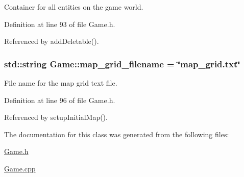 Container for all entities on the game world. 



Definition at line 93 of file Game.\-h.



Referenced by add\-Deletable().

\hypertarget{classGame_a3fe27799b59753fa9d7d0249b17fc64b}{
\subsubsection[{map\-\_\-grid\-\_\-filename}]{\setlength{\rightskip}{0pt plus 5cm}std\-::string Game\-::map\-\_\-grid\-\_\-filename = \char`\"{}map\-\_\-grid.\-txt\char`\"{}\hspace{0.3cm}{\ttfamily [private]}}}\label{classGame_a3fe27799b59753fa9d7d0249b17fc64b}


File name for the map grid text file. 



Definition at line 96 of file Game.\-h.



Referenced by setup\-Initial\-Map().



The documentation for this class was generated from the following files\-:\begin{DoxyCompactItemize}
\item 
\hyperlink{Game_8h}{Game.\-h}\item 
\hyperlink{Game_8cpp}{Game.\-cpp}\end{DoxyCompactItemize}
